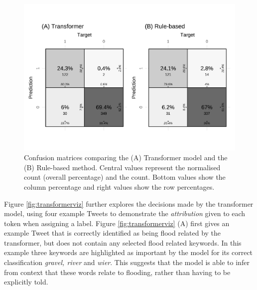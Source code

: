 \documentclass[a4paper, notitlepage]{extreport}
\begin{document}
\begin{figure}[tb]

{\centering \includegraphics[width=.75\linewidth]{index_files/figure-latex/confplot-1} 

}

\caption{Confusion matrices comparing the (A) Transformer model and the (B) Rule-based method. Central values represent the normalised count (overall percentage) and the count. Bottom values show the column percentage and right values show the row percentages.}\label{fig:confplot}
\end{figure}

Figure \ref{fig:transformerviz} further explores the decisions made by
the transformer model, using four example Tweets to demonstrate the
\emph{attribution} given to each token when assigning a label. Figure
\ref{fig:transformerviz} (A) first gives an example Tweet that is
correctly identified as being flood related by the transformer, but does
not contain any selected flood related keywords. In this example three
keywords are highlighted as important by the model for its correct
classification \emph{gravel, river} and \emph{wier}. This suggests that
the model is able to infer from context that these words relate to
flooding, rather than having to be explicitly told.
\end{document}
